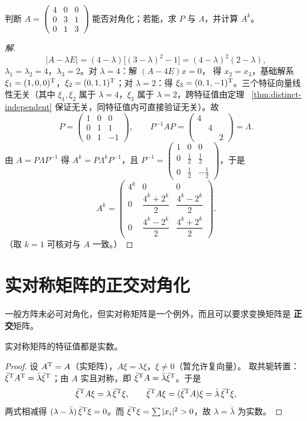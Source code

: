 \begin{example}\label{ex:diagonalize}
判断 $A=\begin{pmatrix} 4 & 0 & 0 \\ 0 & 3 & 1 \\ 0 & 1 & 3 \end{pmatrix}$
能否对角化；若能，求 $P$ 与 $\Lambda$，并计算 $A^k$。
\end{example}
\begin{proof}[解]
\[
  |A-\lambda E|=(4-\lambda)\bigl[(3-\lambda)^2-1\bigr]
  =(4-\lambda)^2(2-\lambda),
\]
$\lambda_1=\lambda_2=4$，$\lambda_3=2$。对 $\lambda=4$：解 $(A-4E)x=0$，
得 $x_2=x_3$，基础解系 $\xi_1=(1,0,0)^{\mathrm{T}}$，$\xi_2=(0,1,1)^{\mathrm{T}}$；对
$\lambda=2$：得 $\xi_3=(0,1,-1)^{\mathrm{T}}$。三个特征向量线性无关（其中
$\xi_1,\xi_2$ 属于 $\lambda=4$，$\xi_3$ 属于 $\lambda=2$，跨特征值由定理
~\ref{thm:distinct-independent} 保证无关，同特征值内可直接验证无关）。故
\[
  P=\begin{pmatrix} 1 & 0 & 0 \\ 0 & 1 & 1 \\ 0 & 1 & -1 \end{pmatrix},
  \qquad
  P^{-1}AP=\begin{pmatrix} 4 & & \\ & 4 & \\ & & 2 \end{pmatrix}=\Lambda .
\]
由 $A=P\Lambda P^{-1}$ 得 $A^k=P\Lambda^kP^{-1}$，且
$P^{-1}=\begin{pmatrix} 1 & 0 & 0 \\ 0 & \tfrac12 & \tfrac12 \\
0 & \tfrac12 & -\tfrac12 \end{pmatrix}$，于是
\[
  A^k=\begin{pmatrix}
    4^k & 0 & 0 \\
    0 & \dfrac{4^k+2^k}{2} & \dfrac{4^k-2^k}{2} \\
    0 & \dfrac{4^k-2^k}{2} & \dfrac{4^k+2^k}{2}
  \end{pmatrix}.
\]
（取 $k=1$ 可核对与 $A$ 一致。）
\end{proof}

\section{实对称矩阵的正交对角化}\label{sec:symmetric}

一般方阵未必可对角化，但实对称矩阵是一个例外，而且可以要求变换矩阵是
\textbf{正交}矩阵。

\begin{theorem}\label{thm:symmetric-real}
实对称矩阵的特征值都是实数。
\end{theorem}
\begin{proof}
设 $A^{\mathrm{T}}=A$（实矩阵），$A\xi=\lambda\xi$，$\xi\neq0$（暂允许复向量）。
取共轭转置：$\bar{\xi}^{\mathrm{T}} A^{\mathrm{T}}=\bar{\lambda}\bar{\xi}^{\mathrm{T}}$；由 $A$
实且对称，即 $\bar{\xi}^{\mathrm{T}} A=\bar{\lambda}\bar{\xi}^{\mathrm{T}}$。于是
\[
  \bar{\xi}^{\mathrm{T}} A\xi=\lambda\,\bar{\xi}^{\mathrm{T}}\xi,
  \qquad
  \bar{\xi}^{\mathrm{T}} A\xi=(\bar{\xi}^{\mathrm{T}} A)\xi=\bar{\lambda}\,\bar{\xi}^{\mathrm{T}}\xi,
\]
两式相减得 $(\lambda-\bar{\lambda})\,\bar{\xi}^{\mathrm{T}}\xi=0$。而
$\bar{\xi}^{\mathrm{T}}\xi=\sum|x_i|^2>0$，故 $\lambda=\bar{\lambda}$ 为实数。
\end{proof}


